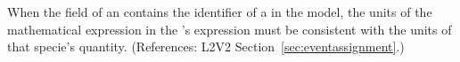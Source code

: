When the  field of an \EventAssignment
contains the identifier of a \Species in the model, the
units of the mathematical expression in the
\EventAssignment's  expression must be
consistent with the units of that specie's quantity.
(References: L2V2 Section~\ref{sec:eventassignment}.)
